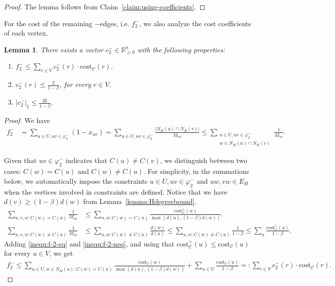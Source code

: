 \documentclass[11pt]{article}
\newcommand{\R}{\mathbb{R}}
\newcommand{\cost}{\mathrm{cost}}
\newtheorem{lemma}[theorem]{Lemma}
\newcommand{\calC}{{\mathcal{C}}}
\begin{document}
\begin{CJK*}{UTF8}{gbsn}
\begin{proof}
    The lemma follows from Claim~\ref{claim:using-coefficients}.
\end{proof}

For the cost of the remaining $-$edges, i.e. $f^-_2$, we also analyze the cost coefficients of each vertex.

\begin{lemma}
    \label{lemma:f-2-properties}
    There exists a vector $c^-_2 \in \R_{\geq 0}^{n}$ with the following properties:
    \begin{enumerate}[label=(\ref{lemma:f-2-properties}\alph*)]
        \item \label{property:f-2-cost} $f^-_2 \leq \sum_{r \in V}c^-_2(r)\cdot \cost_\calC(r)$.
        \item \label{property:f-2-c-2-infty} $c^-_2(r) \leq \frac{2}{1-\beta}$, for every $r \in V$.
        \item \label{property:f-2-c-2-1} $|c^-_2|_1 \leq \frac{2k}{1-\beta}$.
    \end{enumerate}
\end{lemma}
\begin{proof}
We have 
\begin{align*}
    f^-_2 & = \sum_{u \in U, uv \in \varphi^-_2} ( 1- x_{uv}) = \sum_{u \in U, uv \in \varphi^-_2}\frac{|N_{H}(u) \cap N_{H}(v)|}{M_{uv}} \leq \sum_{\substack{u \in U, uv \in \varphi^-_2 \\ w \in N_{H}(u) \cap N_{H}(v)}} \frac{1}{M_{uv}}.
\end{align*}

Given that $uv \in \varphi^-_2$ indicates that $C(u) \neq C(v)$, we distinguish between two cases: $C(w) = C(u)$ and $C(w) \neq C(u)$. For simplicity, in the summations below, we automatically impose the constraints $u \in U, uv \in \varphi^-_2$ and $uw, vw \in E_H$ when the vertices involved in constraints are defined. Notice that we have $d(v) \ge (1-\beta)d(w)$ from Lemma~\ref{lemma:Hdegreebound}. \begin{align}
    \sum_{u,v,w:C(w) = C(u)}\frac1{M_{uv}} &\leq \sum_{u,w:C(w) = C(u)} \frac{\cost^+_{\calC}(w)}{\max(d(u), (1-\beta) d(w))}. \label{inequ:f-2-eq}\\
    \sum_{u,v,w:C(w) \neq C(u)}\frac1{M_{uv}} &\leq \sum_{u, w:C(w) \neq C(u)}\frac{d(w)}{d(u)} \leq \sum_{u, w:C(w) \neq C(u)}\frac{1}{1-\beta} \leq \sum_{u} \frac{\cost^+_\calC(u)}{1-\beta}. \label{inequ:f-2-neq}
\end{align}
Adding \eqref{inequ:f-2-eq} and \eqref{inequ:f-2-neq}, and using that $\cost^+_\calC(u) \leq \cost_\calC(u)$ for every $u \in V$, we get
\begin{align*}
    f^-_2 \leq \sum_{u \in U,w \in N_H(u):C(w) = C(u)} \frac{\cost_{\calC}(w)}{\max(d(u), (1-\beta) d(w))} + \sum_{u \in U} \frac{\cost_\calC(u)}{1-\beta} =: \sum_{r\in V}c^-_2(r) \cdot \cost_\calC(r).
\end{align*}


\end{proof}
\end{CJK*}
\end{document}
